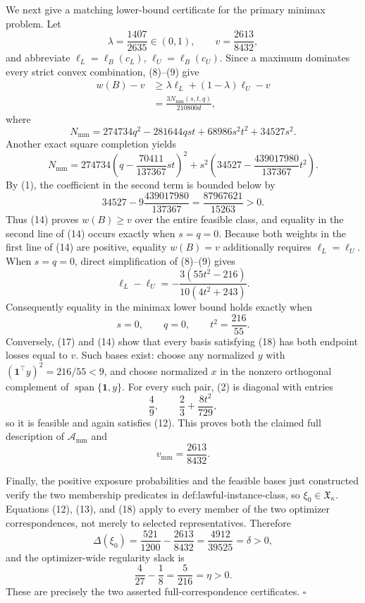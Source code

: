 We next give a matching lower-bound certificate for the primary minimax problem.  Let
\[
 \lambda=\frac{1407}{2635}\in(0,1),
 \qquad
 v=\frac{2613}{8432},
\]
and abbreviate \(\ell_L=\ell_B(c_L)\), \(\ell_U=\ell_B(c_U)\).  Since a maximum dominates every strict convex combination, (8)--(9) give
\[
 \begin{split}
 w(B)-v
 &\ge \lambda\ell_L+(1-\lambda)\ell_U-v\\
 &=\frac{3N_{\mathrm{mm}}(s,t,q)}{210800d},
 \end{split}
 \tag{14}
\]
where
\[
 N_{\mathrm{mm}}
 =274734q^2-281644qst+68986s^2t^2+34527s^2.
\]
Another exact square completion yields
\[
 N_{\mathrm{mm}}
 =274734\left(q-\frac{70411}{137367}st\right)^2
 +s^2\left(34527-\frac{439017980}{137367}t^2\right).
 \tag{15}
\]
By (1), the coefficient in the second term is bounded below by
\[
 34527-9\frac{439017980}{137367}
 =\frac{87967621}{15263}>0.
 \tag{16}
\]
Thus (14) proves \(w(B)\ge v\) over the entire feasible class, and equality in the second line of (14) occurs exactly when \(s=q=0\).  Because both weights in the first line of (14) are positive, equality \(w(B)=v\) additionally requires \(\ell_L=\ell_U\).  When \(s=q=0\), direct simplification of (8)--(9) gives
\[
 \ell_L-\ell_U
 =-\frac{3(55t^2-216)}{10(4t^2+243)}.
 \tag{17}
\]
Consequently equality in the minimax lower bound holds exactly when
\[
 s=0,
 \qquad q=0,
 \qquad t^2=\frac{216}{55}.
 \tag{18}
\]
Conversely, (17) and (14) show that every basis satisfying (18) has both endpoint losses equal to \(v\).  Such bases exist: choose any normalized \(y\) with \((\mathbf1^{\top}y)^2=216/55<9\), and choose normalized \(x\) in the nonzero orthogonal complement of \(\operatorname{span}\{\mathbf1,y\}\).  For every such pair, (2) is diagonal with entries
\[
 \frac49,
 \qquad \frac23+\frac{8t^2}{729},
\]
so it is feasible and again satisfies (12).  This proves both the claimed full description of \(\mathcal A_{\mathrm{mm}}\) and
\[
 v_{\mathrm{mm}}=\frac{2613}{8432}.
\]

Finally, the positive exposure probabilities and the feasible bases just constructed verify the two membership predicates in def:lawful-instance-class, so \(\xi_0\in\mathfrak X_\kappa\).  Equations (12), (13), and (18) apply to every member of the two optimizer correspondences, not merely to selected representatives.  Therefore
\[
 \Delta(\xi_0)
 =\frac{521}{1200}-\frac{2613}{8432}
 =\frac{4912}{39525}=\delta>0,
\]
and the optimizer-wide regularity slack is
\[
 \frac4{27}-\frac18=\frac5{216}=\eta>0.
\]
These are precisely the two asserted full-correspondence certificates. \(\square\)